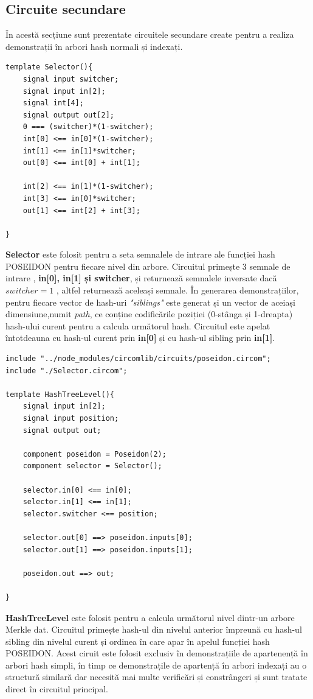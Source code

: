 \documentclass[12pt, letterpaper]{article}
\begin{document}
\subsection{Circuite secundare}
În acestă secțiune sunt prezentate circuitele secundare create pentru a realiza demonstrații în arbori hash normali și indexați.

\begin{lstlisting}[caption="Selector.circom"]
template Selector(){
    signal input switcher;
    signal input in[2];
    signal int[4];
    signal output out[2];
    0 === (switcher)*(1-switcher);
    int[0] <== in[0]*(1-switcher);
    int[1] <== in[1]*switcher;
    out[0] <== int[0] + int[1];

    int[2] <== in[1]*(1-switcher);
    int[3] <== in[0]*switcher;
    out[1] <== int[2] + int[3];

}
\end{lstlisting}

\textbf{Selector} este folosit pentru a seta semnalele de intrare ale funcției hash POSEIDON pentru fiecare nivel din arbore. Circuitul primește 3 semnale de intrare , \textbf{in[0], in[1] și switcher}, și returnează semnalele inversate dacă $switcher=1$ , altfel returnează aceleași semnale. În generarea demonstrațiilor, pentru fiecare vector de hash-uri \emph{"siblings"} este generat și un vector de aceiași dimensiune,numit \emph{path}, ce conține codificările poziției (0-stânga și 1-dreapta) hash-ului curent pentru a calcula următorul hash. Circuitul este apelat întotdeauna cu hash-ul curent prin \textbf{in[0]} și cu hash-ul sibling prin \textbf{in[1]}.


\begin{lstlisting}[caption="HashTreeLevel.circom"]
include "../node_modules/circomlib/circuits/poseidon.circom";
include "./Selector.circom";

template HashTreeLevel(){
    signal input in[2];
    signal input position;
    signal output out;

    component poseidon = Poseidon(2);
    component selector = Selector();

    selector.in[0] <== in[0];
    selector.in[1] <== in[1];
    selector.switcher <== position;

    selector.out[0] ==> poseidon.inputs[0];
    selector.out[1] ==> poseidon.inputs[1];

    poseidon.out ==> out;

}
\end{lstlisting}
\textbf{HashTreeLevel} este folosit pentru a calcula următorul nivel dintr-un arbore Merkle dat. Circuitul primește hash-ul din nivelul anterior împreună cu hash-ul sibling din nivelul curent și ordinea în care apar în apelul funcției hash POSEIDON. Acest ciruit este folosit exclusiv în demonstrațiile de apartenență în arbori hash simpli, în timp ce demonstrațile de apartență în arbori indexați au o structură similară dar necesită mai multe verificări și constrângeri și sunt tratate direct în circuitul principal.
\pagebreak
\end{document}
